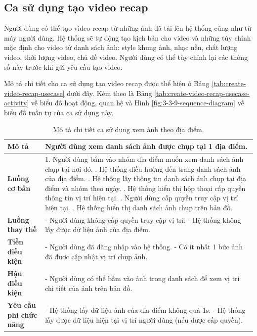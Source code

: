 \subsection{Ca sử dụng tạo video recap}

Người dùng có thể tạo video recap từ những ảnh đã tải lên hệ thống cũng như từ máy người dùng. Hệ thống sẽ tự động tạo kịch bản cho video và những tùy chỉnh mặc định cho video từ danh sách ảnh: style khung ảnh, nhạc nền, chất lượng video, thời lượng video, chủ đề video. Người dùng có thể tùy chỉnh lại các thông số này trước khi gửi yêu cầu tạo video. 

Mô tả chi tiết cho ca sử dụng tạo video recap được thể hiện ở Bảng \ref{tab:create-video-recap-usecase} dưới đây. Kèm theo là Bảng \ref{tab:create-video-recap-usecase-activity} về biểu đồ hoạt động, quan hệ và Hình \ref{fig:3-3-9-sequence-diagram} về biểu đồ tuần tự của ca sử dụng này. 

\noindent 
\begin{xltabular}{\linewidth}{| l | X |} 
\caption{Mô tả chi tiết ca sử dụng xem ảnh theo địa điểm.}
\label{tab:view-image-location-usecase}\\
\hline 
\textbf{Mô tả} & Người dùng xem danh sách ảnh được chụp tại 1 địa điểm. \\
\hline 
\textbf{Luồng cơ bản} & 1. Người dùng bấm vào nhóm địa điểm muốn xem danh sách ảnh chụp tại nơi đó. . Hệ thống điều hướng đến trang danh sách ảnh của địa điểm. . Hệ thống lấy thông tin danh sách ảnh chụp tại địa điểm và nhóm theo ngày. . Hệ thống hiển thị hộp thoại cấp quyền thông tin vị trí hiện tại. . Người dùng cấp quyền truy cập vị trí hiện tại. . Hệ thống hiển thị danh sách ảnh chụp trên bản đồ. \\
\hline
\textbf{Luồng thay thế} & - Người dùng không cấp quyền truy cập vị trí. \newline
                          - Hệ thống không lấy được dữ liệu ảnh của địa điểm. \\
\hline
\textbf{Tiền điều kiện} & - Người dùng đã đăng nhập vào hệ thống. \newline
                          - Có ít nhất 1 bức ảnh đã được cập nhật vị trí chụp ảnh. \\
\hline
\textbf{Hậu điều kiện} & - Người dùng có thể bấm vào ảnh trong danh sách để xem vị trí chi tiết của ảnh trên bản đồ. \\
\hline 
\textbf{Yêu cầu phi chức năng} & - Hệ thống lấy dữ liệu ảnh của địa điểm không quá 1s. \newline
                           - Hệ thống lấy được dữ liệu hiện tại vị trí người dùng (nếu được cấp quyền). \\
\hline 
\end{xltabular}

